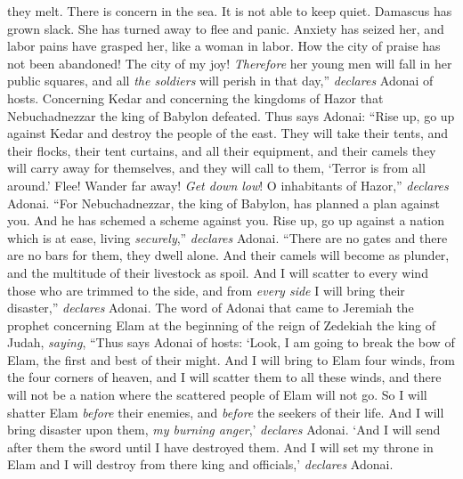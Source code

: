 \begin{biblechapter}
they melt. 
There is concern in the sea. 
It is not able to keep quiet.
\verse Damascus has grown slack. 
She has turned away to flee and panic. 
Anxiety has seized her, 
and labor pains have grasped her, 
like a woman in labor.
\verse How the city of praise has not been abandoned! 
The city of my joy!
\verse \textit{Therefore} her young men will fall in her public squares, 
and all \textit{the soldiers} will perish in that day,” \textit{declares} Adonai of hosts.
 Concerning Kedar and concerning the kingdoms of Hazor that Nebuchadnezzar the king of Babylon defeated. Thus says Adonai:
\verse “Rise up, go up against Kedar 
and destroy the people of the east.
\verse They will take their tents, and their flocks, 
their tent curtains, and all their equipment, 
and their camels they will carry away for themselves, 
and they will call to them, ‘Terror is from all around.’
\verse Flee! Wander far away! \textit{Get down low}! 
O inhabitants of Hazor,” \textit{declares} Adonai. 
“For Nebuchadnezzar, the king of Babylon, has planned a plan against you. 
And he has schemed a scheme against you.
\verse Rise up, go up against a nation which is at ease, 
living \textit{securely},” \textit{declares} Adonai. 
“There are no gates and there are no bars for them, 
they dwell alone.
\verse And their camels will become as plunder, 
and the multitude of their livestock as spoil. 
And I will scatter to every wind those who are trimmed to the side, 
and from \textit{every side} I will bring their disaster,” \textit{declares} Adonai.
 The word of Adonai that came to Jeremiah the prophet concerning Elam at the beginning of the reign of Zedekiah the king of Judah, \textit{saying},
\verse “Thus says Adonai of hosts:
\verse ‘Look, I am going to break the bow of Elam, 
the first and best of their might.
\verse And I will bring to Elam four winds, 
from the four corners of heaven, 
and I will scatter them to all these winds, 
and there will not be a nation 
where the scattered people of Elam will not go.
\verse So I will shatter Elam \textit{before} their enemies, 
and \textit{before} the seekers of their life. 
And I will bring disaster upon them, 
\textit{my burning anger},’ \textit{declares} Adonai. 
‘And I will send after them the sword 
until I have destroyed them.
\verse And I will set my throne in Elam 
and I will destroy from there king and officials,’ \textit{declares} Adonai.
\end{biblechapter}


